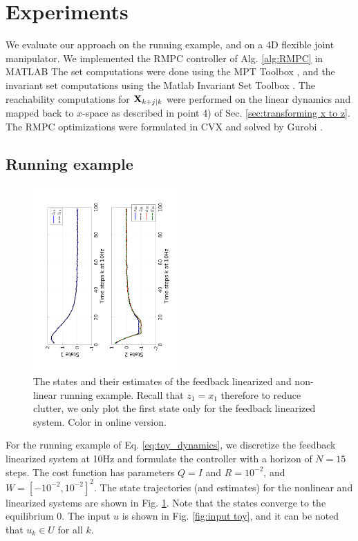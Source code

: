 \section{Experiments}
\label{sec:simulations}

We evaluate our approach on the running example, and on a 4D flexible joint manipulator.
We implemented the RMPC controller of Alg. \ref{alg:RMPC} in MATLAB
The set computations were done using the MPT Toolbox \cite{MPT3}, and the invariant set computations using the Matlab Invariant Set Toolbox \cite{IST}. 
The reachability computations for $\mathbf{X}_{k+j|k}$ were performed on the linear dynamics and mapped back to $x$-space as described in point 4) of Sec. \ref{sec:transforming x to z}. 
The RMPC optimizations were formulated in CVX \cite{cvx} and solved by Gurobi \cite{gurobi}.

\subsection{Running example}

\begin{figure}
	\centering	
	\includegraphics[angle=270,width=0.49\textwidth]{figs/AllStates_toy.pdf}
	\caption{The states and their estimates of the feedback linearized and non-linear running example. Recall that $z_1 = x_1$ therefore to reduce clutter, we only plot the first state only for the feedback linearized system. Color in online version.}
	\label{fig:AllStates_toy}
\end{figure}

For the running example of Eq. \ref{eq:toy_dynamics}, we discretize the feedback linearized system at 10Hz and formulate the controller with a horizon of $N=15$ steps. 
The cost function has parameters $Q=I$ and $R=10^{-2}$, and $W=[-10^{-2}, 10^{-2}]^2$.
The state trajectories (and estimates) for the nonlinear and linearized systems are shown in Fig. \ref{fig:AllStates_toy}.
Note that the states converge to the equilibrium 0. The input $u$ is shown in Fig. \ref{fig:input toy}, and it can be noted that $u_k \in U$ for all $k$.

